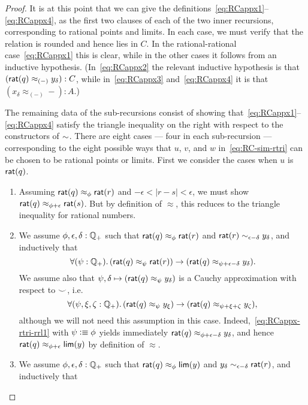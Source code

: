 \begin{proof}
  It is at this point that we can give the definitions~\eqref{eq:RCappx1}--\eqref{eq:RCappx4}, as the first two clauses of each of the two inner recursions, corresponding to rational points and limits.
  In each case, we must verify that the relation is rounded and hence lies in $C$.
  In the rational-rational case~\eqref{eq:RCappx1} this is clear, while in the other cases it follows from an inductive hypothesis.
  (In~\eqref{eq:RCappx2} the relevant inductive hypothesis is that $(\mathsf{rat}(q) \approx_{(-)} y_\delta) : C$, while in~\eqref{eq:RCappx3} and~\eqref{eq:RCappx4} it is that $(x_\delta \approx_{(-)} -) : A$.)

  The remaining data of the sub-recursions consist of showing that~\eqref{eq:RCappx1}--\eqref{eq:RCappx4} satisfy the triangle inequality on the right with respect to the constructors of $\mathord\sim$.
  There are eight cases --- four in each sub-recursion --- corresponding to the eight possible ways that $u$, $v$, and $w$ in~\eqref{eq:RC-sim-rtri} can be chosen to be rational points or limits.
  First we consider the cases when $u$ is $\mathsf{rat}(q)$.
  \begin{enumerate}
  \item Assuming $\mathsf{rat}(q)\approx_\phi \mathsf{rat}(r)$ and $-\epsilon<|r-s|<\epsilon$, we must show $\mathsf{rat}(q)\approx_{\phi+\epsilon} \mathsf{rat}(s)$.
    But by definition of $\approx$, this reduces to the triangle inequality for rational numbers.
  \item We assume $\phi,\epsilon,\delta:\mathbb{Q}_{+}$ such that $\mathsf{rat}(q)\approx_\phi \mathsf{rat}(r)$ and $\mathsf{rat}(r) \sim_{\epsilon-\delta} y_\delta$, and inductively that
    \begin{equation}
      \fall{\psi:\Qp}(\rcrat(q) \approx_{\psi} \rcrat(r)) \to (\rcrat(q) \approx_{\psi+\epsilon-\delta} y_\delta).\label{eq:RCappx-rtri-rrl1}
    \end{equation}
    We assume also that $\psi,\delta\mapsto (\mathsf{rat}(q) \approx_{\psi} y_\delta)$ is a Cauchy approximation with respect to $\smile$, i.e.\
    \begin{equation}
      \fall{\psi,\xi,\zeta:\Qp} (\rcrat(q) \approx_{\psi} y_\xi) \to (\rcrat(q) \approx_{\psi+\xi+\zeta} y_\zeta),\label{eq:RCappx-rtri-rrl2}
    \end{equation}
    although we will not need this assumption in this case.
    Indeed,~\eqref{eq:RCappx-rtri-rrl1} with $\psi\vcentcolon\equiv \phi$ yields immediately $\mathsf{rat}(q) \approx_{\phi+\epsilon-\delta} y_\delta$, and hence $\mathsf{rat}(q) \approx_{\phi+\epsilon} \mathsf{lim}(y)$ by definition of $\approx$.
  \item We assume $\phi,\epsilon,\delta:\mathbb{Q}_{+}$ such that $\mathsf{rat}(q)\approx_\phi \mathsf{lim}(y)$ and $y_\delta \sim_{\epsilon-\delta} \mathsf{rat}(r)$, and inductively that

\end{enumerate}
\end{proof}
